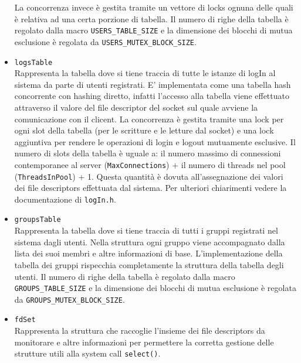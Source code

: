 \documentclass[a4paper,12pt]{report}
\begin{document}
\begin{itemize}
  La concorrenza invece è gestita tramite un vettore di locks ognuna delle quali è relativa ad una certa porzione di tabella.
  Il numero di righe della tabella è regolato dalla macro \texttt{USERS\_TABLE\_SIZE} e la dimensione dei blocchi di mutua esclusione è regolata da
  \texttt{USERS\_MUTEX\_BLOCK\_SIZE}.
\item \texttt{logsTable}\\ Rappresenta la tabella dove si tiene traccia di tutte le istanze di logIn al sistema da parte di utenti registrati.
  E' implementata come una tabella hash concorrente con hashing diretto, infatti l'accesso alla tabella viene effettuato attraverso il valore del file descriptor del socket
  sul quale avviene la comunicazione con il clicent. La concorrenza è gestita tramite una lock per ogni slot della tabella (per le scritture e le letture dal socket) e
  una lock aggiuntiva per rendere le operazioni di login e logout mutuamente esclusive.
  Il numero di slots della tabella è uguale a: il numero massimo di connessioni contemporanee al server (\texttt{MaxConnections}) + il numero di threads nel pool (\texttt{ThreadsInPool}) + 1.
  Questa quantità è dovuta all'assegnazione dei valori dei file descriptors effettuata dal sistema. Per ulteriori chiarimenti vedere la documentazione di \texttt{logIn.h}.
\item \texttt{groupsTable}\\ Rappresenta la tabella dove si tiene traccia di tutti i gruppi registrati nel sistema dagli utenti.
  Nella struttura ogni gruppo viene accompagnato dalla lista dei suoi membri e altre informazioni di base.
  L'implementazione della tabella dei gruppi rispecchia completamente la struttura della tabella degli utenti.
  Il numero di righe della tabella è regolato dalla macro \texttt{GROUPS\_TABLE\_SIZE} e la dimensione dei blocchi di mutua esclusione è regolata da \texttt{GROUPS\_MUTEX\_BLOCK\_SIZE}.
\item \texttt{fdSet}\\ Rappresenta la struttura che raccoglie l'insieme dei file descriptors da monitorare e altre informazioni per permettere la corretta gestione delle strutture utili
  alla system call \texttt{select()}.
\end{itemize}
\end{document}
